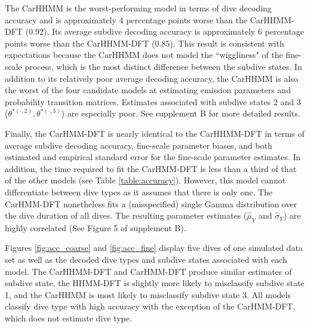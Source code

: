 The CarHHMM is the worst-performing model in terms of dive decoding accuracy and is approximately 4 percentage points worse than the CarHHMM-DFT ($0.92$). Its average subdive decoding accuracy is approximately 6 percentage points worse than the CarHHMM-DFT ($0.85$). This result is consistent with expectations because the CarHHMM does not model the ``wiggliness" of the fine-scale process, which is the most distinct difference between the subdive states. In addition to its relatively poor average decoding accuracy, the CarHHMM is also the worst of the four candidate models at estimating emission parameters and probability transition matrices. Estimates associated with subdive states 2 and 3 ($\theta^{*(\cdot,2)},\theta^{*(\cdot,3)}$) are especially poor. See supplement B for more detailed results.

Finally, the CarHMM-DFT is nearly identical to the CarHHMM-DFT in terms of average subdive decoding accuracy, fine-scale parameter biases, and both estimated and empirical standard error for the fine-scale parameter estimates. In addition, the time required to fit the CarHMM-DFT is less than a third of that of the other models (see Table \ref{table:accuracy}). However, this model cannot differentiate between dive types as it assumes that there is only one. The CarHMM-DFT nonetheless fits a (misspecified) single Gamma distribution over the dive duration of all dives. The resulting parameter estimates ($\hat \mu_Y$ and $\hat \sigma_Y$) are highly correlated (See Figure 5 of supplement B).

Figures \ref{fig:acc_coarse} and \ref{fig:acc_fine} display five dives of one simulated data set as well as the decoded dive types and subdive states associated with each model. The CarHHMM-DFT and CarHMM-DFT produce similar estimates of subdive state, the HHMM-DFT is slightly more likely to misclassify subdive state 1, and the CarHHMM is most likely to misclassify subdive state 3. All models classify dive type with high accuracy with the exception of the CarHMM-DFT, which does not estimate dive type.